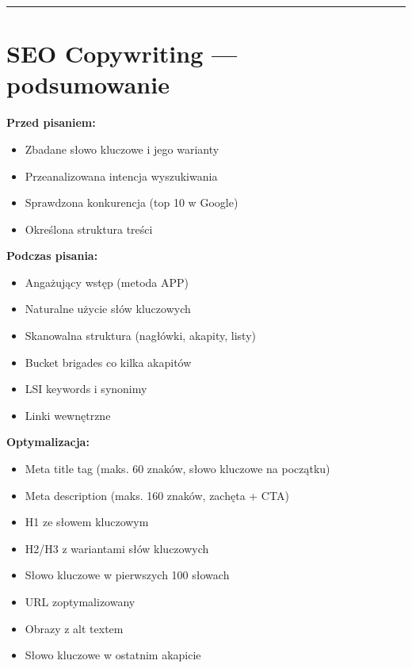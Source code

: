 \documentclass[
  12pt,
  a4paper,
  twoside,
  openright,
  12pt,
  DIV=12,
  BCOR=12mm]{scrbook}
\providecommand{\tightlist}{%
  \setlength{\itemsep}{0pt}\setlength{\parskip}{0pt}}\usepackage{longtable,booktabs,array}
\newcommand{\decoline}{%
  \begin{center}
    \textcolor{bordergray}{\rule{0.3\textwidth}{0.5pt}}
  \end{center}
}
\begin{document}
\decoline

\section{SEO Copywriting ---
podsumowanie}\label{seo-copywriting-podsumowanie}

\textbf{Przed pisaniem:}

\begin{itemize}
\tightlist
\item[$\square$]
  Zbadane słowo kluczowe i jego warianty
\item[$\square$]
  Przeanalizowana intencja wyszukiwania
\item[$\square$]
  Sprawdzona konkurencja (top 10 w Google)
\item[$\square$]
  Określona struktura treści
\end{itemize}

\textbf{Podczas pisania:}

\begin{itemize}
\tightlist
\item[$\square$]
  Angażujący wstęp (metoda APP)
\item[$\square$]
  Naturalne użycie słów kluczowych
\item[$\square$]
  Skanowalna struktura (nagłówki, akapity, listy)
\item[$\square$]
  Bucket brigades co kilka akapitów
\item[$\square$]
  LSI keywords i synonimy
\item[$\square$]
  Linki wewnętrzne
\end{itemize}

\textbf{Optymalizacja:}

\begin{itemize}
\tightlist
\item[$\square$]
  Meta title tag (maks. 60 znaków, słowo kluczowe na początku)
\item[$\square$]
  Meta description (maks. 160 znaków, zachęta + CTA)
\item[$\square$]
  H1 ze słowem kluczowym
\item[$\square$]
  H2/H3 z wariantami słów kluczowych
\item[$\square$]
  Słowo kluczowe w pierwszych 100 słowach
\item[$\square$]
  URL zoptymalizowany
\item[$\square$]
  Obrazy z alt textem
\item[$\square$]
  Słowo kluczowe w ostatnim akapicie
\end{itemize}
\end{document}
